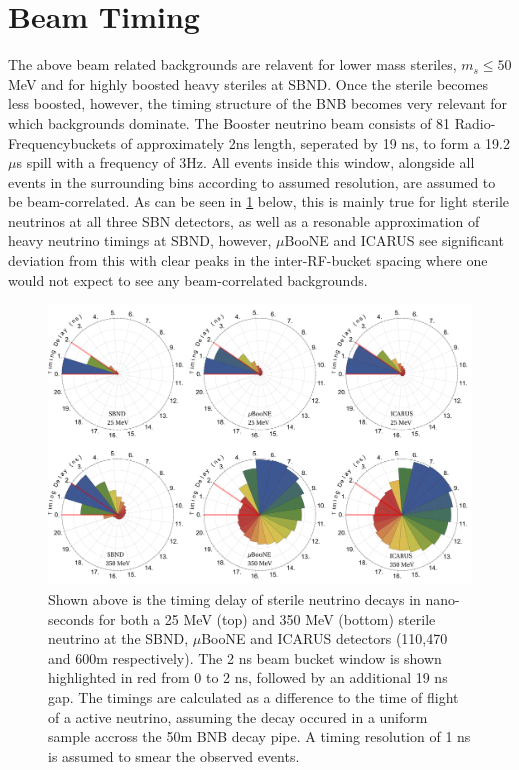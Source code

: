 \documentclass[11pt, a4paper]{article}
\begin{document}
\section{Beam Timing}
The above beam related backgrounds are relavent for lower mass steriles, $m_s \leq 50$ MeV and for highly boosted heavy steriles at SBND. Once the sterile becomes less boosted, however, the timing structure of the BNB becomes very relevant for which backgrounds dominate. The Booster neutrino beam consists of 81 Radio-Frequencybuckets of approximately 2ns length, seperated by 19 ns, to form a 19.2$\mu$s spill with a frequency of 3Hz. All events inside this window, alongside all events in the surrounding bins according to assumed resolution, are assumed to be beam-correlated. As can be seen in \ref{fig:timing} below, this is mainly true for light sterile neutrinos at all three SBN detectors, as well as a resonable approximation of heavy neutrino timings at SBND, however, $\mu$BooNE and ICARUS see significant deviation from this with clear peaks in the inter-RF-bucket spacing where one would not expect to see any beam-correlated backgrounds.


\begin{figure}[t]
\center
\includegraphics[width=\textwidth]{figures/timing.pdf}
\caption{\label{fig:timing} Shown above is the timing delay of sterile neutrino decays in nano-seconds for both a 25 MeV (top) and 350 MeV (bottom) sterile neutrino at the SBND, $\mu$BooNE and ICARUS detectors (110,470 and 600m respectively). The 2 ns beam bucket window is shown highlighted in red from 0 to 2 ns, followed by an additional 19 ns gap. The timings are calculated as a difference to the time of flight of a active neutrino, assuming the decay occured in a uniform sample accross the 50m BNB decay pipe. A timing resolution of 1 ns is assumed to smear the observed events.}
\end{figure}
\end{document}
